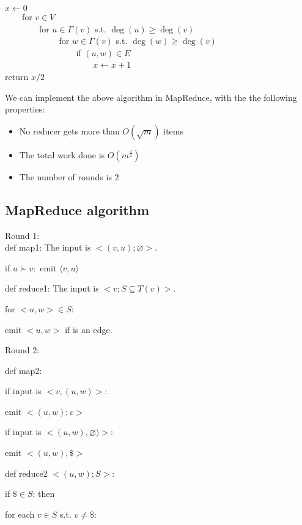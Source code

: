 \documentclass[11pt]{article}
\newcommand{\tab}[1]{\hspace{.05\textwidth}\rlap{#1}}
\begin{document}
$x\leftarrow 0$
\\$\mbox{ }\mbox{ }\mbox{ }$for $v\in V$
\\$\mbox{ }\mbox{ }\mbox{ }$$\mbox{ }\mbox{ }\mbox{ }$for $u\in\Gamma(v)$ s.t. $\deg(u)\ge \deg(v)$
\\$\mbox{ }\mbox{ }\mbox{ }$$\mbox{ }\mbox{ }\mbox{ }$$\mbox{ }\mbox{ }\mbox{ }$ for $w\in \Gamma(v)$ s.t. $\deg(w)\ge \deg(v)$
\\$\mbox{ }\mbox{ }\mbox{ }$$\mbox{ }\mbox{ }\mbox{ }$$\mbox{ }\mbox{ }\mbox{ }$$\mbox{ }\mbox{ }\mbox{ }$ if $(u,w)\in E$
\\$\mbox{ }\mbox{ }\mbox{ }$$\mbox{ }\mbox{ }\mbox{ }$$\mbox{ }\mbox{ }\mbox{ }$$\mbox{ }\mbox{ }\mbox{ }$$\mbox{ }\mbox{ }\mbox{ }$ $x\leftarrow x+1$
\\return $x/2$

We can implement the above algorithm in MapReduce, with the the following properties: 
\begin{itemize}
\item No reducer gets more than $O(\sqrt{m})$ items
\item The total work done is $O(m^\frac{3}{2})$
\item The number of rounds is $2$
\end{itemize}
\subsection{MapReduce algorithm}

Round 1:
\\
def map1: The input is $<(v, u);\varnothing>$.

\tab{} if $u \succ v:$ emit $\langle v, u \rangle$

def reduce1: The input is $<v;S\subseteq T(v)>$.

\tab{} for $<u, w> \in S$:

\tab{}\tab{} emit $<u,w>$ if is an edge.

Round 2:

def map2:

\tab{} if input is $<v, (u, w)>$:

\tab{}\tab{} emit $<(u, w); v>$

\tab{} if input is $<(u,w), \varnothing)>$:

\tab{}\tab{} emit $<(u, w), \$>$

def reduce2 $<(u, w); S>$:

\tab{} if $\$ \in S$: then

\tab{}\tab{} for each $v \in S$ s.t. $v \ne \$$:
\end{document}
